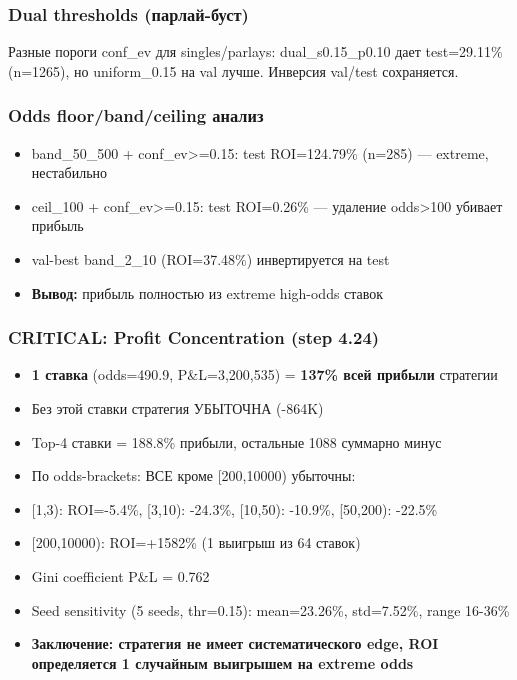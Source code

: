 \documentclass[12pt,a4paper]{article}
\begin{document}
\subsubsection{Dual thresholds (парлай-буст)}
Разные пороги conf\_ev для singles/parlays: dual\_s0.15\_p0.10 дает test=29.11\% (n=1265), но uniform\_0.15 на val лучше. Инверсия val/test сохраняется.

\subsubsection{Odds floor/band/ceiling анализ}
\begin{itemize}
  \item band\_50\_500 + conf\_ev>=0.15: test ROI=124.79\% (n=285) — extreme, нестабильно
  \item ceil\_100 + conf\_ev>=0.15: test ROI=0.26\% — удаление odds>100 убивает прибыль
  \item val-best band\_2\_10 (ROI=37.48\%) инвертируется на test
  \item \textbf{Вывод:} прибыль полностью из extreme high-odds ставок
\end{itemize}

\subsubsection{CRITICAL: Profit Concentration (step 4.24)}
\begin{itemize}
  \item \textbf{1 ставка} (odds=490.9, P\&L=3,200,535) = \textbf{137\% всей прибыли} стратегии
  \item Без этой ставки стратегия УБЫТОЧНА (-864K)
  \item Top-4 ставки = 188.8\% прибыли, остальные 1088 суммарно минус
  \item По odds-brackets: ВСЕ кроме [200,10000) убыточны:
  \item [1,3): ROI=-5.4\%, [3,10): -24.3\%, [10,50): -10.9\%, [50,200): -22.5\%
  \item [200,10000): ROI=+1582\% (1 выигрыш из 64 ставок)
  \item Gini coefficient P\&L = 0.762
  \item Seed sensitivity (5 seeds, thr=0.15): mean=23.26\%, std=7.52\%, range 16-36\%
  \item \textbf{Заключение: стратегия не имеет систематического edge, ROI определяется 1 случайным выигрышем на extreme odds}
\end{itemize}
\end{document}
